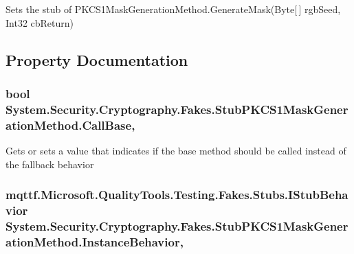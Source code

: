 Sets the stub of P\-K\-C\-S1\-Mask\-Generation\-Method.\-Generate\-Mask(\-Byte\mbox{[}$\,$\mbox{]} rgb\-Seed, Int32 cb\-Return)



\subsection{Property Documentation}
\hypertarget{class_system_1_1_security_1_1_cryptography_1_1_fakes_1_1_stub_p_k_c_s1_mask_generation_method_a2cd6172d858c49f1a5309049ef37b03b}{
\subsubsection[{Call\-Base}]{\setlength{\rightskip}{0pt plus 5cm}bool System.\-Security.\-Cryptography.\-Fakes.\-Stub\-P\-K\-C\-S1\-Mask\-Generation\-Method.\-Call\-Base\hspace{0.3cm}{\ttfamily [get]}, {\ttfamily [set]}}}\label{class_system_1_1_security_1_1_cryptography_1_1_fakes_1_1_stub_p_k_c_s1_mask_generation_method_a2cd6172d858c49f1a5309049ef37b03b}


Gets or sets a value that indicates if the base method should be called instead of the fallback behavior

\hypertarget{class_system_1_1_security_1_1_cryptography_1_1_fakes_1_1_stub_p_k_c_s1_mask_generation_method_a343753dec76e0eeb483b26f838267e2d}{
\subsubsection[{Instance\-Behavior}]{\setlength{\rightskip}{0pt plus 5cm}mqttf.\-Microsoft.\-Quality\-Tools.\-Testing.\-Fakes.\-Stubs.\-I\-Stub\-Behavior System.\-Security.\-Cryptography.\-Fakes.\-Stub\-P\-K\-C\-S1\-Mask\-Generation\-Method.\-Instance\-Behavior\hspace{0.3cm}{\ttfamily [get]}, {\ttfamily [set]}}}\label{class_system_1_1_security_1_1_cryptography_1_1_fakes_1_1_stub_p_k_c_s1_mask_generation_method_a343753dec76e0eeb483b26f838267e2d}


